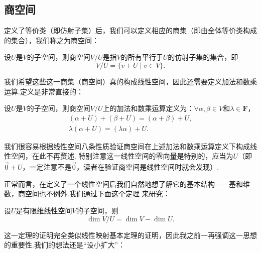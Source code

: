 \subsection{商空间}
定义了等价类（即仿射子集）后，我们可以定义相应的商集（即由全体等价类构成的集合），我们称之为商空间：
\begin{definition}
    设$U$是$V$的子空间，则商空间$V/U$是指$V$的所有平行于$U$的仿射子集的集合，即
    \[V/U=\{v+U \mid v\in V\}.\]
\end{definition}
我们希望这些这一商集（商空间）真的构成线性空间，因此还需要定义加法和数乘运算.定义是非常直接的：
\begin{definition}
    设$U$是$V$的子空间，则商空间$V/U$上的加法和数乘运算定义为：$\forall \alpha,\beta\in V$和$\lambda\in\mathbf{F}$，
    \begin{gather*}
        (\alpha+U)+(\beta+U)=(\alpha+\beta)+U, \\
        \lambda(\alpha+U)=(\lambda\alpha)+U.
    \end{gather*}
\end{definition}
我们很容易根据线性空间八条性质验证商空间在上述加法和数乘运算定义下构成线性空间，在此不再赘述.
特别注意这一线性空间的零向量是特别的，应当为$U$（即$\vec{0}+U$，一定注意不是$\vec{0}$，读者在验证商空间是线性空间时就会发现）.

正常而言，在定义了一个线性空间后我们自然地想了解它的基本结构——基和维数，商空间也不例外.我们通过下面这个定理
来研究：
\begin{theorem}\label{thm:8:商空间维数}
    设$U$是有限维线性空间$V$的子空间，则
    \[\dim V/U=\dim V-\dim U.\]
\end{theorem}
这一定理的证明完全类似线性映射基本定理的证明，因此我之前一再强调这一思想的重要性.我们的想法还是``设小扩大''：


